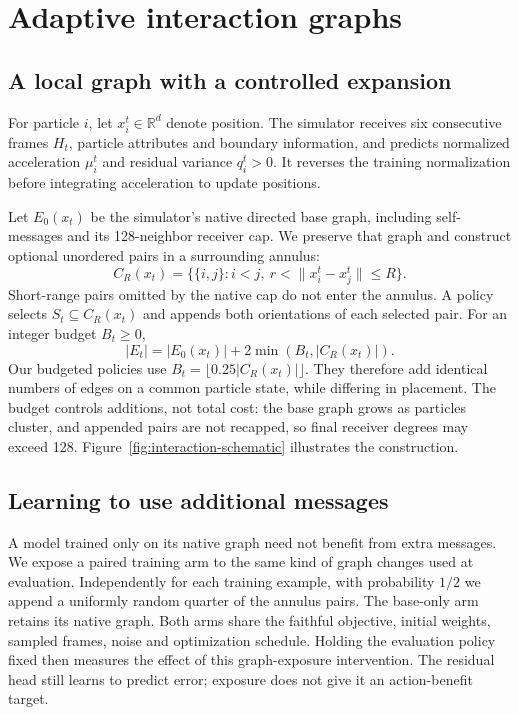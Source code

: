 \section{Adaptive interaction graphs}
\subsection{A local graph with a controlled expansion}
For particle $i$, let $x_i^t\in\mathbb R^d$ denote position. The simulator receives six consecutive frames $H_t$, particle attributes and boundary information, and predicts normalized acceleration $\mu_i^t$ and residual variance $q_i^t>0$. It reverses the training normalization before integrating acceleration to update positions.

Let $E_0(x_t)$ be the simulator's native directed base graph, including self-messages and its 128-neighbor receiver cap. We preserve that graph and construct optional unordered pairs in a surrounding annulus:
\begin{equation}
 C_R(x_t)=\{\{i,j\}:i<j,\ r<\|x_i^t-x_j^t\|\le R\}.
\end{equation}
Short-range pairs omitted by the native cap do not enter the annulus. A policy selects $S_t\subseteq C_R(x_t)$ and appends both orientations of each selected pair. For an integer budget $B_t\ge0$,
\begin{equation}
 |E_t|=|E_0(x_t)|+2\min(B_t,|C_R(x_t)|).
 \label{eq:budget}
\end{equation}
Our budgeted policies use $B_t=\lfloor0.25|C_R(x_t)|\rfloor$. They therefore add identical numbers of edges on a common particle state, while differing in placement. The budget controls additions, not total cost: the base graph grows as particles cluster, and appended pairs are not recapped, so final receiver degrees may exceed 128. Figure~\ref{fig:interaction-schematic} illustrates the construction.

\subsection{Learning to use additional messages}
A model trained only on its native graph need not benefit from extra messages. We expose a paired training arm to the same kind of graph changes used at evaluation. Independently for each training example, with probability $1/2$ we append a uniformly random quarter of the annulus pairs. The base-only arm retains its native graph. Both arms share the faithful objective, initial weights, sampled frames, noise and optimization schedule. Holding the evaluation policy fixed then measures the effect of this graph-exposure intervention. The residual head still learns to predict error; exposure does not give it an action-benefit target.

